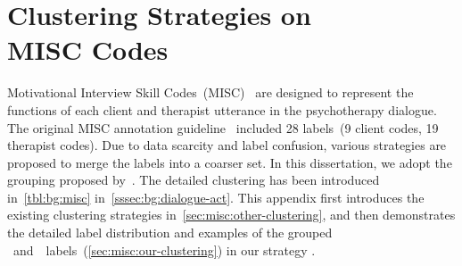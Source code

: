 \chapter[Clustering Strategies on MISC Codes]{Clustering
  Strategies on \\MISC Codes}
\label{chap:appendix:misc-clustering}

Motivational Interview Skill
Codes~(MISC)~\citep{miller2003motivational,miller2012motivational} are
designed to represent the functions of each client and therapist
utterance in the psychotherapy dialogue.  The original MISC annotation
guideline~\citep{miller2003manual} included 28 labels~(9 client codes,
19 therapist codes). Due to data scarcity and label confusion, various
strategies are proposed to merge the labels into a coarser set. In
this dissertation, we adopt the grouping proposed
by~\citet{xiao2016behavioral}. The detailed clustering has been
introduced in~\autoref{tbl:bg:misc}
in~\autoref{sssec:bg:dialogue-act}. This appendix first introduces the
existing clustering strategies in~\autoref{sec:misc:other-clustering},
and then demonstrates the detailed label distribution and examples of
the grouped \MIA~and~\MIN~labels~(\autoref{sec:misc:our-clustering})
in our strategy .



